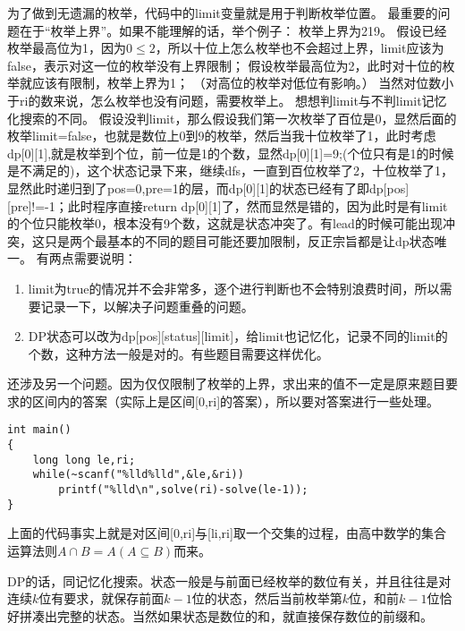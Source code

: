	为了做到无遗漏的枚举，代码中的limit变量就是用于判断枚举位置。
	最重要的问题在于“枚举上界”。如果不能理解的话，举个例子：
	枚举上界为219。
	假设已经枚举最高位为1，因为$0\le 2$，所以十位上怎么枚举也不会超过上界，limit应该为false，表示对这一位的枚举没有上界限制；
	假设枚举最高位为2，此时对十位的枚举就应该有限制，枚举上界为1；
	（对高位的枚举对低位有影响。）
	当然对位数小于ri的数来说，怎么枚举也没有问题，需要枚举上。
	想想判limit与不判limit记忆化搜索的不同。
	假设没判limit，那么假设我们第一次枚举了百位是0，显然后面的枚举limit=false，也就是数位上0到9的枚举，然后当我十位枚举了1，此时考虑dp[0][1],就是枚举到个位，前一位是1的个数，显然dp[0][1]=9;(个位只有是1的时候是不满足的)，这个状态记录下来，继续dfs，一直到百位枚举了2，十位枚举了1，显然此时递归到了pos=0,pre=1的层，而dp[0][1]的状态已经有了即dp[pos][pre]!=-1；此时程序直接return dp[0][1]了，然而显然是错的，因为此时是有limit的个位只能枚举0，根本没有9个数，这就是状态冲突了。有lead的时候可能出现冲突，这只是两个最基本的不同的题目可能还要加限制，反正宗旨都是让dp状态唯一。
	有两点需要说明：
	\begin{enumerate}
		\item{limit为true的情况并不会非常多，逐个进行判断也不会特别浪费时间，所以需要记录一下，以解决子问题重叠的问题。}
		\item{DP状态可以改为dp[pos][status][limit]，给limit也记忆化，记录不同的limit的个数，这种方法一般是对的。有些题目需要这样优化。}
	\end{enumerate}
	还涉及另一个问题。因为仅仅限制了枚举的上界，求出来的值不一定是原来题目要求的区间内的答案（实际上是区间[0,ri]的答案），所以要对答案进行一些处理。
	\begin{verbatim}
int main()  
{  
    long long le,ri;  
    while(~scanf("%lld%lld",&le,&ri))  
        printf("%lld\n",solve(ri)-solve(le-1));  
}  
\end{verbatim}

	上面的代码事实上就是对区间[0,ri]与[li,ri]取一个交集的过程，由高中数学的集合运算法则$A\cap B=A(A\subseteq B)$而来。

	DP的话，同记忆化搜索。状态一般是与前面已经枚举的数位有关，并且往往是对连续$k$位有要求，就保存前面$k-1$位的状态，然后当前枚举第$k$位，和前$k-1$位恰好拼凑出完整的状态。当然如果状态是数位的和，就直接保存数位的前缀和。
